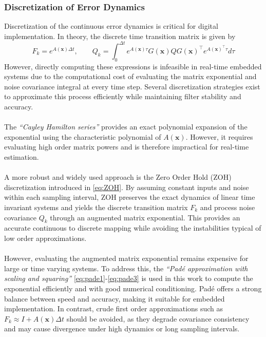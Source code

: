 \subsubsection{Discretization of Error Dynamics}
Discretization of the continuous error dynamics is critical for digital implementation. In theory, the discrete time transition matrix is given by
\begin{equation}
    F_k = e^{A(\mathbf{x})\Delta t}, \qquad
    Q_k = \int_0^{\Delta t} e^{A(\mathbf{x})\tau} G(\mathbf{x}) Q G(\mathbf{x})^\top e^{A(\mathbf{x})^\top\tau} d\tau
    \label{eq:state-estimation-error-state-dynamics-discretized}
\end{equation}
However, directly computing these expressions is infeasible in real-time embedded systems due to the computational cost of evaluating the matrix exponential and noise covariance integral at every time step. Several discretization strategies exist to approximate this process efficiently while maintaining filter stability and accuracy.  
\\ \\
The \textit{``Cayley Hamilton series''} provides an exact polynomial expansion of the exponential using the characteristic polynomial of $A(\mathbf{x})$. However, it requires evaluating high order matrix powers and is therefore impractical for real-time estimation.
\\ \\
A more robust and widely used approach is the Zero Order Hold (ZOH) discretization introduced in \eqref{eq:ZOH}. By assuming constant inputs and noise within each sampling interval, ZOH preserves the exact dynamics of linear time invariant systems and yields the discrete transition matrix $F_k$ and process noise covariance $Q_k$ through an augmented matrix exponential. This provides an accurate continuous to discrete mapping while avoiding the instabilities typical of low order approximations.
\\ \\
However, evaluating the augmented matrix exponential remains expensive for large or time varying systems. To address this, the \textit{``Padé approximation with scaling and squaring''} \eqref{eq:pade1}-\eqref{eq:pade3} is used in this work to compute the exponential efficiently and with good numerical conditioning. Padé offers a strong balance between speed and accuracy, making it suitable for embedded implementation. In contrast, crude first order approximations such as $F_k \approx I + A(\mathbf{x})\Delta t$ should be avoided, as they degrade covariance consistency and may cause divergence under high dynamics or long sampling intervals.



